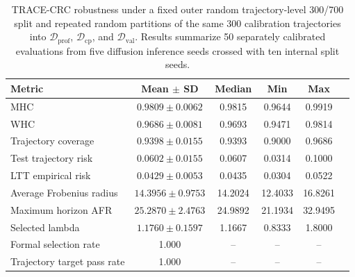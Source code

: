\begin{table}[!htbp]
\centering
\scriptsize
\caption{TRACE-CRC robustness under a fixed outer random trajectory-level 300/700 split and repeated random partitions of the same 300 calibration trajectories into $\mathcal{D}_{\mathrm{prof}}$, $\mathcal{D}_{\mathrm{cp}}$, and $\mathcal{D}_{\mathrm{val}}$. Results summarize 50 separately calibrated evaluations from five diffusion inference seeds crossed with ten internal split seeds.}
\label{tab:trace-internal-split-robustness}
\begin{tabular}{lccccc}
\toprule
Metric & Mean $\pm$ SD & Median & Min & Max \\
\midrule
MHC & $0.9809 \pm 0.0062$ & 0.9815 & 0.9644 & 0.9919 \\
WHC & $0.9686 \pm 0.0081$ & 0.9693 & 0.9471 & 0.9814 \\
Trajectory coverage & $0.9398 \pm 0.0155$ & 0.9393 & 0.9000 & 0.9686 \\
Test trajectory risk & $0.0602 \pm 0.0155$ & 0.0607 & 0.0314 & 0.1000 \\
LTT empirical risk & $0.0429 \pm 0.0053$ & 0.0435 & 0.0304 & 0.0522 \\
Average Frobenius radius & $14.3956 \pm 0.9753$ & 14.2024 & 12.4033 & 16.8261 \\
Maximum horizon AFR & $25.2870 \pm 2.4763$ & 24.9892 & 21.1934 & 32.9495 \\
Selected lambda & $1.1760 \pm 0.1597$ & 1.1667 & 0.8333 & 1.8000 \\
\midrule
Formal selection rate & 1.000 & -- & -- & -- \\
Trajectory target pass rate & 1.000 & -- & -- & -- \\
\bottomrule
\end{tabular}
\end{table}
